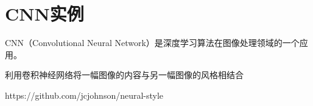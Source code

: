 \section{CNN实例}
CNN（Convolutional Neural Network）是深度学习算法在图像处理领域的一个应用。

利用卷积神经网络将一幅图像的内容与另一幅图像的风格相结合~\cite{Johnson2015}

https://github.com/jcjohnson/neural-style

